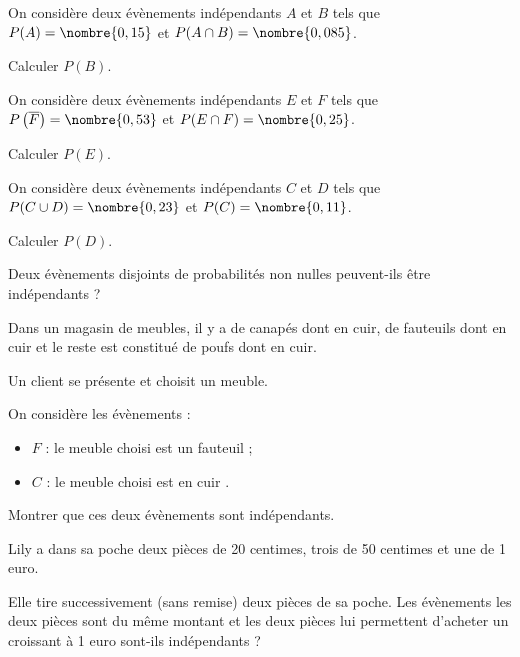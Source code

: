 \documentclass[12pt,a4paper,french]{article}
\begin{document}
\begin{question}
  On considère deux évènements indépendants $A$ et $B$ tels que
  $P(A)=\nombre{0,15}$ et $P(A\cap B)=\nombre{0,085}$.

  Calculer $P(B)$.
\end{question}

\begin{question}
  On considère deux évènements indépendants $E$ et $F$ tels que
  $P\left(\overline{F}\right)=\nombre{0,53}$ et
  $P(E\cap F)=\nombre{0,25}$.

  Calculer $P(E)$.
\end{question}

\begin{question}
  On considère deux évènements indépendants $C$ et $D$ tels que
  $P(C\cup D)=\nombre{0,23}$ et $P(C)=\nombre{0,11}$.

  Calculer $P(D)$.
\end{question}

\begin{question}[subtitle={Indépendants et incompatibles ?}]
  Deux évènements disjoints de probabilités non nulles peuvent-ils
  être indépendants ?
\end{question}

\begin{question}
  Dans un magasin de meubles, il y a  de canapés dont  en
  cuir,  de fauteuils dont  en cuir et le reste est
  constitué de poufs dont  en cuir.

  Un client se présente et choisit un meuble.

  On considère les évènements :
  \begin{itemize}
    \item $F$ : \og le meuble choisi est un fauteuil \fg{} ;
    \item $C$ : \og le meuble choisi est en cuir \fg.
  \end{itemize}

  Montrer que ces deux évènements sont indépendants.
\end{question}

\begin{question}
  Lily a dans sa poche deux pièces de 20 centimes, trois de 50 centimes et
  une de 1 euro.

  Elle tire successivement (sans remise) deux pièces de sa poche. Les
  évènements \og les deux pièces sont du même montant \fg{} et \og les deux
  pièces lui permettent d'acheter un croissant à 1 euro \fg{} sont-ils
  indépendants ?
\end{question}
\end{document}
